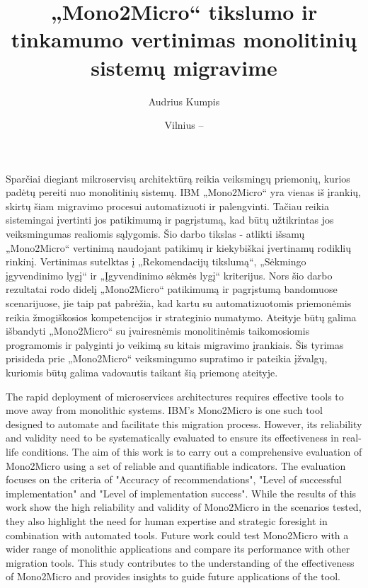 \documentclass{VUMIFPSbakalaurinis}
\institute{Informatikos institutas}  %
\title{„Mono2Micro“ tikslumo ir tinkamumo vertinimas monolitinių sistemų migravime}
\author{Audrius Kumpis}
\date{Vilnius – \the\year}
\begin{document}
\maketitle

Sparčiai diegiant mikroservisų architektūrą reikia veiksmingų priemonių, kurios padėtų pereiti nuo monolitinių sistemų. IBM „Mono2Micro“ yra vienas iš įrankių, skirtų šiam migravimo procesui automatizuoti ir palengvinti. Tačiau reikia sistemingai įvertinti jos patikimumą ir pagrįstumą, kad būtų užtikrintas jos veiksmingumas realiomis sąlygomis. Šio darbo tikslas - atlikti išsamų „Mono2Micro“ vertinimą naudojant patikimų ir kiekybiškai įvertinamų rodiklių rinkinį. Vertinimas sutelktas į „Rekomendacijų tikslumą“, „Sėkmingo įgyvendinimo lygį“ ir „Įgyvendinimo sėkmės lygį“ kriterijus. Nors šio darbo rezultatai rodo didelį „Mono2Micro“ patikimumą ir pagrįstumą bandomuose scenarijuose, jie taip pat pabrėžia, kad kartu su automatizuotomis priemonėmis reikia žmogiškosios kompetencijos ir strateginio numatymo. Ateityje būtų galima išbandyti „Mono2Micro“ su įvairesnėmis monolitinėmis taikomosiomis programomis ir palyginti jo veikimą su kitais migravimo įrankiais. Šis tyrimas prisideda prie „Mono2Micro“ veiksmingumo supratimo ir pateikia įžvalgų, kuriomis būtų galima vadovautis taikant šią priemonę ateityje.

The rapid deployment of microservices architectures requires effective tools to move away from monolithic systems. IBM's Mono2Micro is one such tool designed to automate and facilitate this migration process. However, its reliability and validity need to be systematically evaluated to ensure its effectiveness in real-life conditions. The aim of this work is to carry out a comprehensive evaluation of Mono2Micro using a set of reliable and quantifiable indicators. The evaluation focuses on the criteria of "Accuracy of recommendations", "Level of successful implementation" and "Level of implementation success". While the results of this work show the high reliability and validity of Mono2Micro in the scenarios tested, they also highlight the need for human expertise and strategic foresight in combination with automated tools. Future work could test Mono2Micro with a wider range of monolithic applications and compare its performance with other migration tools. This study contributes to the understanding of the effectiveness of Mono2Micro and provides insights to guide future applications of the tool.
\end{document}
